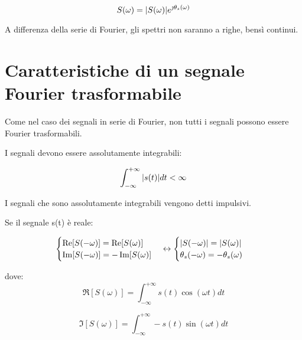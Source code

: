 {
    \Large 
    \begin{equation}
        S(\omega) = \abs{S(\omega)} e^{\jmath \theta_s (\omega)}
    \end{equation}
}

A differenza della serie di Fourier, gli spettri non saranno a righe, bensì continui. \newline 

\newpage 

\section{Caratteristiche di un segnale Fourier trasformabile} 

Come nel caso dei segnali in serie di Fourier, 
non tutti i segnali possono essere Fourier trasformabili. \newline 

I segnali devono essere assolutamente integrabili: 

{
    \Large 
    \begin{equation}
        \int_{-\infty}^{+\infty} \abs{s(t)} dt < \infty
    \end{equation}
} 

I segnali che sono assolutamente integrabili vengono detti impulsivi. \newline 

Se il segnale s(t) è reale: 

{
    \Large
    \begin{equation}
        \begin{cases}
            \Re[S(-\omega)] = \Re[S(\omega)] \\ 
            \Im [S(-\omega)] = -\Im[S(\omega)]
        \end{cases}
        \leftrightarrow
        \begin{cases}
            \abs{S(-\omega)} = \abs{S(\omega)} \\ 
            \theta_s (-\omega) = - \theta_s (\omega)
        \end{cases}
    \end{equation}
}

dove: 
{
    \Large 
    \begin{equation}
        \Re[S(\omega)] = \int_{-\infty}^{+\infty} s(t) \cos(\omega t ) dt
    \end{equation}
}

{
    \Large 
    \begin{equation}
        \Im[S(\omega)] = \int_{-\infty}^{+\infty} - s(t) \sin(\omega t ) dt
    \end{equation}
}

